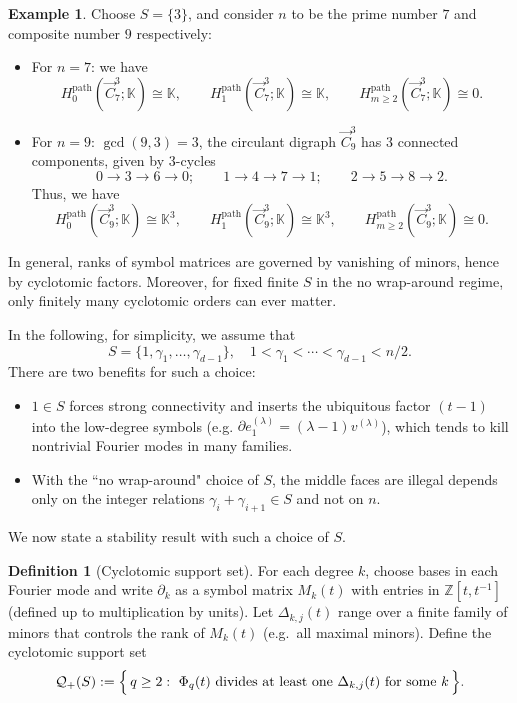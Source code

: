 \documentclass[11pt]{amsart}
\newcommand{\Z}{\mathbb Z}
\newcommand{\K}{\mathbb K}
\theoremstyle{plain}
\theoremstyle{definition}
\newtheorem{definition}[theorem]{Definition}
\newtheorem{example}[theorem]{Example}
\numberwithin{equation}{section}
\begin{document}
\begin{example} Choose $S=\{3\}$, and consider $n$ to be the prime number $7$ and composite number $9$ respectively:
\begin{itemize}
    \item For $n=7$: we have
    \[H_0^{\mathrm{path}}(\vec{C}_7^3;\K)\cong\K,\qquad H_1^{\mathrm{path}}(\vec{C}_7^3;\K)\cong\K,\qquad H_{m\ge 2}^{\mathrm{path}}(\vec{C}_7^3;\K)\cong0.\]
    \item For $n=9$: $\gcd(9,3)=3$, the circulant digraph $\vec{C}_9^3$ has $3$ connected components, given by 3-cycles 
    \[0\rightarrow3\rightarrow6\rightarrow0; \qquad 1\rightarrow4\rightarrow7\rightarrow1;\qquad 2\rightarrow5\rightarrow8\rightarrow2.\]
    Thus, we have
    \[H_0^{\mathrm{path}}(\vec{C}_9^3;\K)\cong\K^3,\qquad H_1^{\mathrm{path}}(\vec{C}_9^3;\K)\cong\K^3,\qquad H_{m\ge 2}^{\mathrm{path}}(\vec{C}_9^3;\K)\cong0.\]
\end{itemize}
\end{example}



In general, ranks of symbol matrices are governed by vanishing of minors, hence by cyclotomic factors. Moreover, for fixed finite $S$ in the no wrap-around regime, only finitely many cyclotomic orders can ever matter. 

In the following, for simplicity, we assume that
\[S=\{1,\gamma_1,\ldots,\gamma_{d-1}\},\quad 1<\gamma_1<\cdots<\gamma_{d-1}<n/2.\]
There are two benefits for such a choice:
\begin{itemize}
\setlength{\itemsep}{0pt}
    \item  $1\in S$ forces strong connectivity and inserts the ubiquitous factor $(t-1)$ into the low-degree symbols (e.g.  $\partial e_1^{(\lambda)}=(\lambda-1)v^{(\lambda)}$), which tends to kill nontrivial Fourier modes in many families. 
    \item With the ``no wrap-around" choice of $S$, the middle faces are illegal depends only on the integer relations $\gamma_i+\gamma_{i+1}\in S$ and not on $n$.
\end{itemize}


We now state a stability result with such a choice of $S$.






\begin{definition}[Cyclotomic support set]\label{def:Qplus}
For each degree $k$, choose bases in each Fourier mode and write
$\partial_k$ as a symbol matrix $M_k(t)$ with entries in $\Z[t,t^{-1}]$ (defined up to multiplication by units).
Let $\Delta_{k,j}(t)$ range over a finite family of minors that controls the rank of $M_k(t)$ (e.g.\ all maximal minors).
Define the cyclotomic support set
\[
\mathcal Q_+(S):=\Bigl\{\, q\ge 2:\ \Phi_q(t)\ \text{divides at least one }\Delta_{k,j}(t)\ \text{for some }k\,\Bigr\}.
\]
\end{definition}
\end{document}
